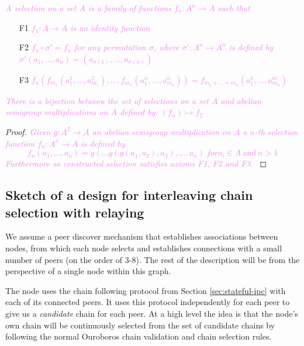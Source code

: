 \documentclass{article}
\newcommand{\coot}[1]{\textcolor{violet}{\emph{#1}}}
\theoremstyle{definition}{
  \newtheorem{lemma}{Lemma}[section] %
  \newtheorem{definition}[lemma]{Definition}
}
\theoremstyle{theorem}{
  \newtheorem{invariant}[lemma]{Invariant}
  \newtheorem{proofobligation}[lemma]{Proof Obligation}
}
\numberwithin{equation}{lemma}
\begin{document}
\begin{definition}
    \coot{A selection on a set \(A\) is a family of functions
    \(f_n:A^n\rightarrow A\) such that}
    \begin{enumerate}
        \item[F1] \coot{\(f_1:A\rightarrow A\) is an identity function}
        \item[F2]\coot{\(f_n\circ\sigma' = f_n\) for any permutation \(\sigma\),
            where \(\sigma':A^n\rightarrow A^n\) is defined by
            \(\sigma'(a_1,\dots,a_n)=(a_{\sigma(1)},\dots,a_{\sigma(n)})\)}
        \item[F3]\coot{\(f_n(f_{m_1}(a^1_1,\dots,a^1_{m_1}),\dots,f_{m_n}(a^n_1,\dots,a^n_{m_n}))=f_{m_1+\dots+m_n}(a^1_1,\dots,a^m_{m_n})\)}
    \end{enumerate}
\end{definition}

\begin{lemma}
    \coot{There is a bijection between the set of selections on a set \(A\)
    and abelian semigroup multiplications on \(A\) defined by:
    \((f_n)\mapsto f_2\)
    }
\end{lemma}
\begin{proof}
    \coot{
        Given \(g:A^2\rightarrow A\) an abelian semigroup multiplication on
        \(A\) a \(n\)-th
        selection function \(f_n:A^n\rightarrow A\) is defined by
        $$f_n(a_1,\dots,a_n)=g(\dots g(g(a_1,a_2),a_3),\dots,a_n)\ for a_i\in
        A\ \mathrm{and}\ n>1$$
        Furthermore so constructed selection satisfies axioms \rm{F1}, \rm{F2} and
        \rm{F3}.
    }
\end{proof}
\subsection{Sketch of a design for interleaving chain selection with relaying}

We assume a peer discover mechanism that establishes associations between
nodes, from which each node selects and establishes connections with a small
number of peers (on the order of 3-8). The rest of the description will be
from the perspective of a single node within this graph.

The node uses the chain following protocol from Section \ref{sec:stateful-ipc}
with each of its connected peers. It uses this protocol independently for each
peer to give us a \emph{candidate} chain for each peer. At a high level the
idea is that the node's own chain will be continuously selected from the set of
candidate chains by following the normal Ouroboros chain validation and chain
selection rules.
\end{document}
